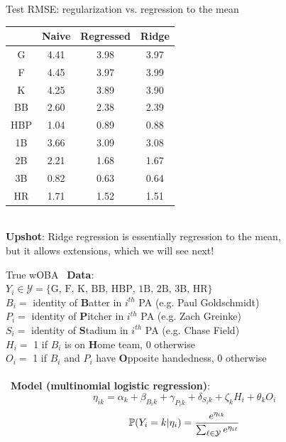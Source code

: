 \documentclass{beamer}
\def\Y{\mathcal Y}\def\Z{\mathcal Z}
\begin{document}
\begin{frame}{Test RMSE: regularization vs. regression to the mean}
\centering
\begin{tabular}{c|ccc}
    & Naive & Regressed & Ridge\\
    \hline
G   & 4.41  & 3.98      & 3.97\\
F   & 4.45  & 3.97      & 3.99\\
K   & 4.25  & 3.89      & 3.90\\
BB  & 2.60  & 2.38      & 2.39\\
HBP & 1.04  & 0.89      & 0.88\\
1B  & 3.66  & 3.09      & 3.08\\
2B  & 2.21  & 1.68      & 1.67\\
3B  & 0.82  & 0.63      & 0.64\\
HR  & 1.71  & 1.52      & 1.51
\end{tabular}\\
\vspace{1cm}
{\bf Upshot}: Ridge regression is essentially regression to the mean,\\
but it allows extensions, which we will see next!
\end{frame}

\begin{frame}{True wOBA}
~{\bf Data}:\\
$Y_i \in \Y = \{\mbox{G, F, K, BB, HBP, 1B, 2B, 3B, HR}\}$\\
$B_i =$ identity of {\bf B}atter in $i^{th}$ PA (e.g. Paul Goldschmidt)\\
$P_i =$ identity of {\bf P}itcher in $i^{th}$ PA (e.g. Zach Greinke)\\
$S_i =$ identity of {\bf S}tadium in $i^{th}$ PA (e.g. Chase Field)\\
$H_i =$ 1 if $B_i$ is on {\bf H}ome team, 0 otherwise\\
$O_i =$ 1 if $B_i$ and $P_i$ have {\bf O}pposite handedness, 0 otherwise\\~\\
~{\bf Model (multinomial logistic regression)}:
$$\eta_{ik} = \alpha_k + \beta_{B_ik} + \gamma_{P_ik} +
    \delta_{S_ik} + \zeta_kH_i + \theta_kO_i$$
$$\mP(Y_i=k|\eta_i) = \frac{e^{\eta_{ik}}}{\sum_{\ell\in\Y}e^{\eta_{i\ell}}}$$
\end{frame}
\end{document}
